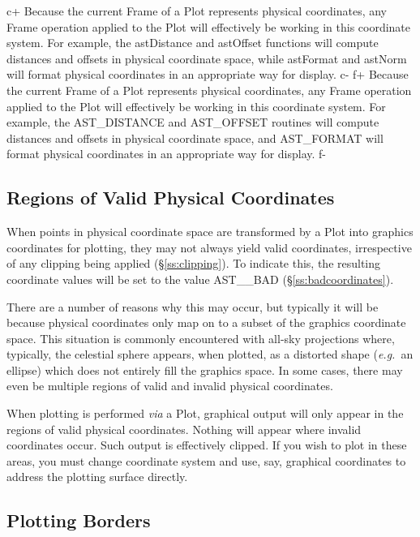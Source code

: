 \documentclass[twoside,11pt]{article}
\newcommand{\secref}[1]{\S\ref{#1}}
\newcommand{\secref}[1]{\ref{#1}}
\begin{document}
c+
Because the current Frame of a Plot represents physical coordinates,
any Frame operation applied to the Plot will effectively be working in
this coordinate system. For example, the astDistance and astOffset
functions will compute distances and offsets in physical coordinate
space, while astFormat and astNorm will format physical coordinates in
an appropriate way for display.
c-
f+
Because the current Frame of a Plot represents physical coordinates,
any Frame operation applied to the Plot will effectively be working in
this coordinate system. For example, the AST\_DISTANCE and AST\_OFFSET
routines will compute distances and offsets in physical coordinate
space, and AST\_FORMAT will format physical coordinates in an
appropriate way for display.
f-

\subsection{\label{ss:validphysicalcoordinates}Regions of Valid Physical Coordinates}

When points in physical coordinate space are transformed by a Plot
into graphics coordinates for plotting, they may not always yield
valid coordinates, irrespective of any clipping being applied
(\secref{ss:clipping}). To indicate this, the resulting coordinate
values will be set to the value AST\_\_BAD
(\secref{ss:badcoordinates}).

There are a number of reasons why this may occur, but typically it
will be because physical coordinates only map on to a subset of the
graphics coordinate space. This situation is commonly encountered with
all-sky projections where, typically, the celestial sphere appears,
when plotted, as a distorted shape ({\em{e.g.}}\ an ellipse) which
does not entirely fill the graphics space. In some cases, there may
even be multiple regions of valid and invalid physical coordinates.

When plotting is performed {\em{via}} a Plot, graphical output will
only appear in the regions of valid physical coordinates. Nothing will
appear where invalid coordinates occur. Such output is effectively
clipped. If you wish to plot in these areas, you must change
coordinate system and use, say, graphical coordinates to address the
plotting surface directly.

\subsection{Plotting Borders}
\end{document}
